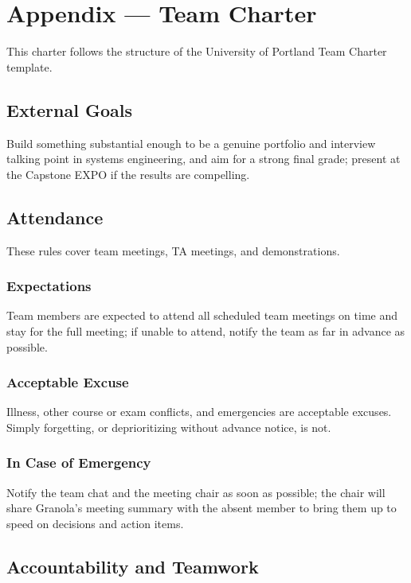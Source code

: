 \documentclass{article}
\begin{document}
\newpage{}

\section*{Appendix --- Team Charter}

This charter follows the structure of the University of Portland Team
Charter template.

\subsection*{External Goals}

Build something substantial enough to be a genuine portfolio and interview
talking point in systems engineering, and aim for a strong final grade;
present at the Capstone EXPO if the results are compelling.

\subsection*{Attendance}

These rules cover team meetings, TA meetings, and demonstrations.

\subsubsection*{Expectations}

Team members are expected to attend all scheduled team meetings on time and
stay for the full meeting; if unable to attend, notify the team as far in
advance as possible.

\subsubsection*{Acceptable Excuse}

Illness, other course or exam conflicts, and emergencies are acceptable
excuses. Simply forgetting, or deprioritizing without advance notice, is
not.

\subsubsection*{In Case of Emergency}

Notify the team chat and the meeting chair as soon as possible; the chair
will share Granola's meeting summary with the absent member to bring them
up to speed on decisions and action items.

\subsection*{Accountability and Teamwork}
\end{document}
